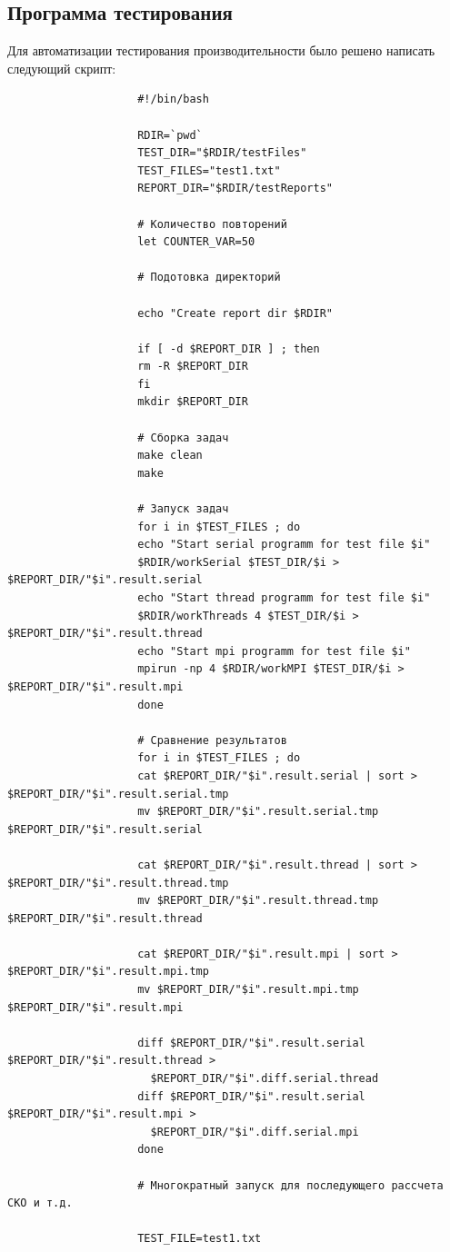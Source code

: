\documentclass[12pt,a4paper]{report}
\begin{document}
			\subsection{Программа тестирования}
				Для автоматизации тестирования производительности было решено написать следующий скрипт:
				\begin{verbatim}
					#!/bin/bash
					
					RDIR=`pwd`
					TEST_DIR="$RDIR/testFiles"
					TEST_FILES="test1.txt"
					REPORT_DIR="$RDIR/testReports"
					
					# Количество повторений
					let COUNTER_VAR=50
					
					# Подотовка директорий
					
					echo "Create report dir $RDIR"
					
					if [ -d $REPORT_DIR ] ; then
					rm -R $REPORT_DIR
					fi
					mkdir $REPORT_DIR
					
					# Сборка задач
					make clean
					make
					
					# Запуск задач
					for i in $TEST_FILES ; do
					echo "Start serial programm for test file $i"
					$RDIR/workSerial $TEST_DIR/$i > $REPORT_DIR/"$i".result.serial
					echo "Start thread programm for test file $i"
					$RDIR/workThreads 4 $TEST_DIR/$i > $REPORT_DIR/"$i".result.thread
					echo "Start mpi programm for test file $i"
					mpirun -np 4 $RDIR/workMPI $TEST_DIR/$i > $REPORT_DIR/"$i".result.mpi
					done
					
					# Сравнение результатов
					for i in $TEST_FILES ; do
					cat $REPORT_DIR/"$i".result.serial | sort > $REPORT_DIR/"$i".result.serial.tmp
					mv $REPORT_DIR/"$i".result.serial.tmp $REPORT_DIR/"$i".result.serial
	
					cat $REPORT_DIR/"$i".result.thread | sort > $REPORT_DIR/"$i".result.thread.tmp
					mv $REPORT_DIR/"$i".result.thread.tmp $REPORT_DIR/"$i".result.thread
					
					cat $REPORT_DIR/"$i".result.mpi | sort > $REPORT_DIR/"$i".result.mpi.tmp
					mv $REPORT_DIR/"$i".result.mpi.tmp $REPORT_DIR/"$i".result.mpi
					
					diff $REPORT_DIR/"$i".result.serial $REPORT_DIR/"$i".result.thread >
					  $REPORT_DIR/"$i".diff.serial.thread
					diff $REPORT_DIR/"$i".result.serial $REPORT_DIR/"$i".result.mpi >
					  $REPORT_DIR/"$i".diff.serial.mpi
					done
					
					# Многократный запуск для последующего рассчета СКО и т.д.
					
					TEST_FILE=test1.txt
					

\end{verbatim}
\end{document}

